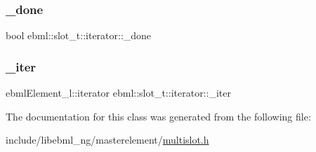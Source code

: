 \subsubsection{\texorpdfstring{\+\_\+done}{\_done}}
{\footnotesize\ttfamily bool ebml\+::slot\+\_\+t\+::iterator\+::\+\_\+done}

\mbox{\label{classebml_1_1slot__t_1_1iterator_a7fc036596fbe3968b64f1bfec6eb8952}} 
\subsubsection{\texorpdfstring{\+\_\+iter}{\_iter}}
{\footnotesize\ttfamily ebml\+Element\+\_\+l\+::iterator ebml\+::slot\+\_\+t\+::iterator\+::\+\_\+iter}



The documentation for this class was generated from the following file\+:\begin{DoxyCompactItemize}
\item 
include/libebml\+\_\+ng/masterelement/\mbox{\hyperlink{multislot_8h}{multislot.\+h}}\end{DoxyCompactItemize}
